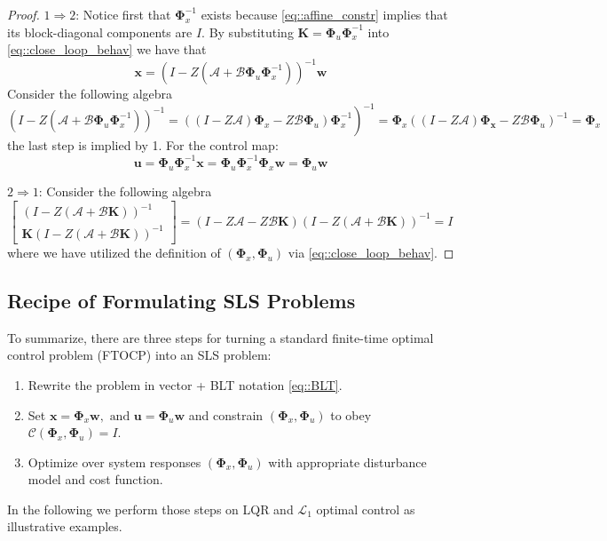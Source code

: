 \documentclass{article}[12pt]
\begin{document}
\begin{proof}
$1 \Rightarrow 2$: Notice first that $\mathbf{\Phi}^{-1}_x$ exists because \eqref{eq::affine_constr} implies that its block-diagonal components are $I$. By substituting $\mathbf{K}=\mathbf{\Phi}_{u} \mathbf{\Phi}_{x}^{-1}$ into \eqref{eq::close_loop_behav} we have that
\begin{equation}
    \mathbf{x}=\left(I-Z\left(\mathcal{A}+\mathcal{B} \mathbf{\Phi}_{u} \mathbf{\Phi}_{x}^{-1}\right)\right)^{-1} \mathbf{w}
\end{equation}
Consider the following algebra
\begin{equation}
    \left.\left(I-Z\left(\mathcal{A}+\mathcal{B} \mathbf{\Phi}_{u} \mathbf{\Phi}_{x}^{-1}\right)\right)^{-1}=\left((I-Z \mathcal{A}) \mathbf{\Phi}_{x}-Z \mathcal{B} \mathbf{\Phi}_{u}\right) \mathbf{\Phi}_{x}^{-1}\right)^{-1}=\mathbf{\Phi}_{x}\left((I-Z \mathcal{A}) \mathbf{\Phi}_{\mathbf{x}}-Z \mathcal{B} \mathbf{\Phi}_{u}\right)^{-1}=\mathbf{\Phi}_{x}
\end{equation}
the last step is implied by 1. For the control map:
\begin{equation}
    \mathbf{u}=\mathbf{\Phi}_{u} \mathbf{\Phi}_{x}^{-1} \mathbf{x}=\mathbf{\Phi}_{u} \mathbf{\Phi}_{x}^{-1} \mathbf{\Phi}_{x} \mathbf{w}=\mathbf{\Phi}_{u} \mathbf{w}
\end{equation}

\noindent $2 \Rightarrow 1$: Consider the following algebra
\begin{equation}
    [I-Z \mathcal{A} \ -Z \mathcal{B}]\left[\begin{array}{c}{(I-Z(\mathcal{A}+\mathcal{B} \mathbf{K}))^{-1}} \\ {\mathbf{K}(I-Z(\mathcal{A}+\mathcal{B }\mathbf{K}))^{-1}}\end{array}\right]=(I-Z \mathcal{A}-Z \mathcal{B} \mathbf{K})(I-Z(\mathcal{A}+\mathcal{B} \mathbf{K}))^{-1}=I
\end{equation}
where we have utilized the definition of $(\mathbf{\Phi}_{x}, \mathbf{\Phi}_u)$ via \eqref{eq::close_loop_behav}.
\end{proof}

\subsection{Recipe of Formulating SLS Problems}
To summarize, there are three steps for turning a standard finite-time optimal control problem (FTOCP) into an SLS problem:
\begin{enumerate}
    \item Rewrite the problem in vector + BLT notation \eqref{eq::BLT}.
    \item Set $\mathbf{x}=\mathbf{\Phi}_{x} \mathbf{w}, \text { and } \mathbf{u}=\mathbf{\Phi}_{u} \mathbf{w}$ and constrain $(\mathbf{\Phi}_{x}, \mathbf{\Phi}_u)$ to obey $\mathcal{C}\left(\mathbf{\Phi}_{x}, \mathbf{\Phi}_{u}\right)=I$.
    \item Optimize over system responses $(\mathbf{\Phi}_{x}, \mathbf{\Phi}_u)$ with appropriate disturbance model and cost function.
\end{enumerate}
In the following we perform those steps on LQR and $\mathcal{L}_1$ optimal control as illustrative examples.
\end{document}
